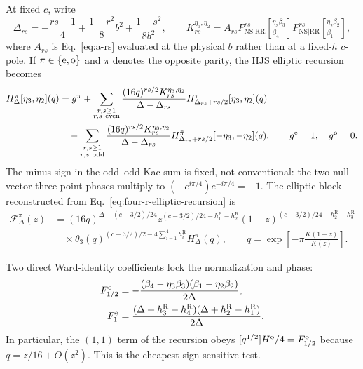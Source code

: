 \documentclass[11pt]{article}
\newcommand{\NS}{\mathrm{NS}}
\newcommand{\R}{\mathrm{R}}
\newcommand{\F}{\mathcal F}
\begin{document}
At fixed $c$, write
\begin{equation}
 \Delta_{rs}
 =-\frac{rs-1}{4}
  +\frac{1-r^2}{8}b^2+\frac{1-s^2}{8b^2},
 \qquad
 K_{rs}^{\eta_3,\eta_2}
 =A_{rs}
 P_{\NS|\R\R}^{rs}
 \left[{}^{\eta_3\beta_3}_{\beta_4}\right]
 P_{\NS|\R\R}^{rs}
 \left[{}^{\eta_2\beta_2}_{\beta_1}\right],
 \label{eq:four-r-kernel}
\end{equation}
where $A_{rs}$ is Eq.~\eqref{eq:a-rs} evaluated at the physical $b$ rather
than at a fixed-$h$ $c$-pole.  If $\pi\in\{{\rm e},{\rm o}\}$ and
$\bar\pi$ denotes the opposite parity, the HJS elliptic recursion becomes
\begin{equation}
\begin{aligned}
 H_\Delta^\pi[\eta_3,\eta_2](q)
 &=g^\pi
 +\sum_{\substack{r,s\ge1\\r,s\ \mathrm{even}}}
 \frac{(16q)^{rs/2}K_{rs}^{\eta_3,\eta_2}}
      {\Delta-\Delta_{rs}}
 H_{\Delta_{rs}+rs/2}^{\pi}[\eta_3,\eta_2](q)
 \\
 &\quad-\sum_{\substack{r,s\ge1\\r,s\ \mathrm{odd}}}
 \frac{(16q)^{rs/2}K_{rs}^{\eta_3,\eta_2}}
      {\Delta-\Delta_{rs}}
 H_{\Delta_{rs}+rs/2}^{\bar\pi}
 [-\eta_3,-\eta_2](q),
 \qquad g^{\rm e}=1,\quad g^{\rm o}=0.
\end{aligned}
\label{eq:four-r-elliptic-recursion}
\end{equation}
The minus sign in the odd--odd Kac sum is fixed, not conventional: the two
null-vector three-point phases multiply to
$(-e^{i\pi/4})e^{-i\pi/4}=-1$.  The elliptic block reconstructed from
Eq.~\eqref{eq:four-r-elliptic-recursion} is
\begin{equation}
\begin{aligned}
 \F_\Delta^\pi(z)
 &=(16q)^{\Delta-(c-3/2)/24}
 z^{(c-3/2)/24-h_1^\R-h_2^\R}
 (1-z)^{(c-3/2)/24-h_2^\R-h_3^\R}
 \\[-0.2em]
 &\quad\times
 \theta_3(q)^{(c-3/2)/2-4\sum_{i=1}^4h_i^\R}
 H_\Delta^\pi(q),
 \qquad
 q=\exp\!\left[-\pi\frac{K(1-z)}{K(z)}\right].
\end{aligned}
\label{eq:four-r-elliptic-prefactor}
\end{equation}

Two direct Ward-identity coefficients lock the normalization and phase:
\begin{align}
 F_{1/2}^{\rm o}
 &=-\frac{(\beta_4-\eta_3\beta_3)
              (\beta_1-\eta_2\beta_2)}{2\Delta},
 \notag\\
 F_1^{\rm e}
 &=\frac{(\Delta+h_3^\R-h_4^\R)
              (\Delta+h_2^\R-h_1^\R)}{2\Delta}.
 \label{eq:four-r-direct-anchors}
\end{align}
In particular, the $(1,1)$ term of the recursion obeys
$[q^{1/2}]H^{\rm o}/4=F_{1/2}^{\rm o}$ because
$q=z/16+O(z^2)$.  This is the cheapest sign-sensitive test.
\end{document}
